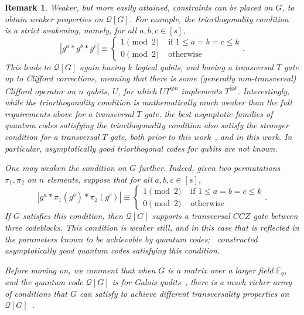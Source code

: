 \documentclass{article}
\newcounter{main}[section]
\newtheorem{remark}[main]{Remark}
\begin{document}
\begin{remark}
    Weaker, but more easily attained, constraints can be placed on $G$, to obtain weaker properties on $\mathcal{Q}[G]$. For example, the triorthogonality condition~\cite{bravyi2012magic} is a strict weakening, namely, for all $a,b,c \in [s]$,
    \begin{equation}
        |g^a*g^b*g^c| \equiv \begin{cases}
            1 \pmod 2 &\text{ if } 1 \leq a = b = c \leq k\\
            0 \pmod 2 &\text{ otherwise}
        \end{cases}.
    \end{equation}
    This leads to $\mathcal{Q}[G]$ again having $k$ logical qubits, and having a transversal $T$ gate up to Clifford corrections, meaning that there is some (generally non-transversal) Clifford operator on $n$ qubits, $U$, for which $UT^{\otimes n}$ implements $\overline{T^{\otimes k}}$. Interestingly, while the triorthogonality condition is mathematically much weaker than the full requirements above for a transversal $T$ gate, the best asymptotic families of quantum codes satisfying the triorthogonality condition also satisfy the stronger condition for a transversal $T$ gate, both prior to this work~\cite{hastings2018distillation,haah2018towers}, and in this work. In particular, asymptotically good triorthogonal codes for qubits are not known.
    
    One may weaken the condition on $G$ further. Indeed, given two permutations $\pi_1, \pi_2$ on $n$ elements, suppose that for all $a,b,c \in [s]$,
    \begin{equation}
        |g^a*\pi_1(g^b)*\pi_2(g^c)| \equiv \begin{cases}
            1 \pmod 2 &\text{ if } 1 \leq a = b = c \leq k\\
            0 \pmod 2 &\text{ otherwise}
        \end{cases}.
    \end{equation}
    If $G$ satisfies this condition, then $\mathcal{Q}[G]$ supports a transversal $CCZ$ gate between three codeblocks. This condition is weaker still, and in this case that is reflected in the parameters known to be achievable by quantum codes;~\cite{golowich2025asymptotically,nguyen2024good} constructed asymptotically good quantum codes satisfying this condition.
    
    Before moving on, we comment that when $G$ is a matrix over a larger field $\mathbb{F}_q$, and the quantum code $\mathcal{Q}[G]$ is for Galois qudits~\cite{wills2026review}, there is a much richer array of conditions that $G$ can satisfy to achieve different transversality properties on $\mathcal{Q}[G]$~\cite{wills2024,Gong2026BinaryExtensionFields}.
\end{remark}
\end{document}
